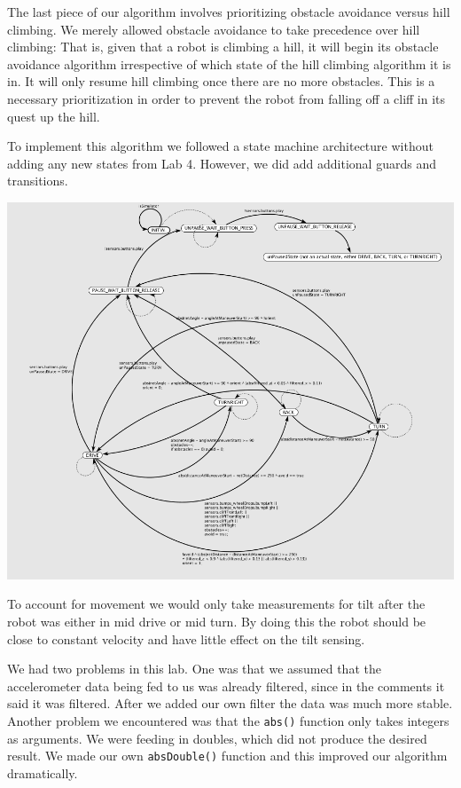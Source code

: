 \documentclass[10pt,titlepage]{article}
\begin{document}
    The last piece of our algorithm involves prioritizing obstacle avoidance versus hill climbing. We merely allowed obstacle avoidance to take precedence over hill climbing: That is, given that a robot is climbing a hill, it will begin its obstacle avoidance algorithm irrespective of which state of the hill climbing algorithm it is in. It will only resume hill climbing once there are no more obstacles. This is a necessary prioritization in order to prevent the robot from falling off a cliff in its quest up the hill.

    To implement this algorithm we followed a state machine architecture without adding any new states from Lab 4. However, we did add additional guards and transitions. 
    \begin{center} 
      \includegraphics[width=\textwidth]{../lab5_data/FSMLab5}
    \end{center}
    
    To account for movement we would only take measurements for tilt after the robot was either in mid drive or mid turn. By doing this the robot should be close to constant velocity and have little effect on the tilt sensing.

    We had two problems in this lab. One was that we assumed that the accelerometer data being fed to us was already filtered, since in the comments it said it was filtered. After we added our own filter the data was much more stable. Another problem we encountered was that the \texttt{abs()} function only takes integers as arguments. We were feeding in doubles, which did not produce the desired result. We made our own \texttt{absDouble()} function and this improved our algorithm dramatically.
\end{document}

